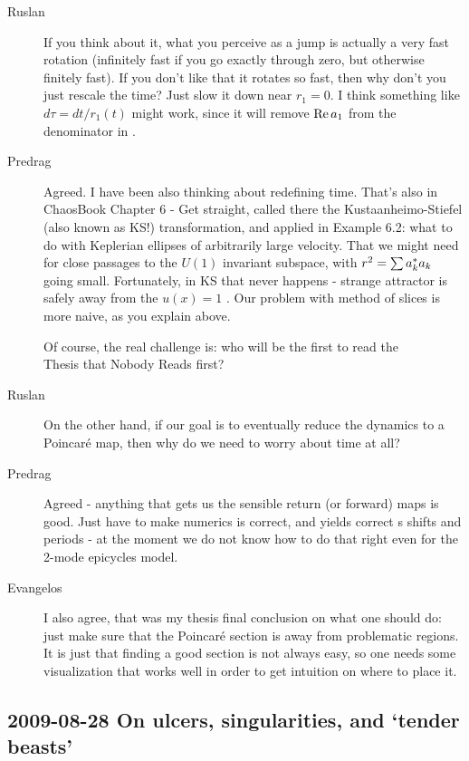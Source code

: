 \begin{description}
\item[Ruslan]
If you think about it, what you perceive as a jump is
actually a very fast rotation (infinitely fast if you go
exactly through zero, but otherwise finitely fast).  If you
don't like that it rotates so fast, then why don't you just
rescale the time?  Just slow it down near $r_1 = 0$.  I think
something like $d\tau = dt/r_1(t)$ might work, since it will
remove ${\rm Re}\,a_1$ from the denominator in
.

\item[Predrag]
Agreed. I have been also thinking about redefining time.
That's also in ChaosBook
 {Chapter 6 - Get straight},
called there the
Kustaanheimo-Stiefel (also known as KS!) transformation, and
applied in Example 6.2: what to do with Keplerian ellipses of
arbitrarily large velocity. That we might need for close
passages to the $U(1)$ invariant subspace, with $r^2 = \sum
a_k^*a_k$ going small. Fortunately, in KS that never
happens - strange attractor is safely away from the $u(x)=1$
\eqv. Our problem with method of slices is more naive, as you
explain above.

Of course, the real challenge is: who will be the first to read the
\\
      {Thesis that Nobody Reads} first?

\item[Ruslan]
On the other hand, if our goal is to eventually reduce the
dynamics to a Poincar\'e map, then why do we need to worry
about time at all?

\item[Predrag]
Agreed - anything that gets us the sensible return (or
forward) maps is good. Just have to make numerics is correct,
and yields correct \rpo s shifts and periods - at the moment
we do not know how to do that right even for the 2-mode
epicycles model.

\item[Evangelos]
I also agree, that was my thesis final conclusion on what one should do: just
make sure that the Poincar\'e section is away from problematic regions. It is
just that finding a good section is not always easy, so one needs some visualization
that works well in order to get intuition on where to place it.
\end{description}

\subsection{2009-08-28 On ulcers, singularities, and `tender beasts'}

